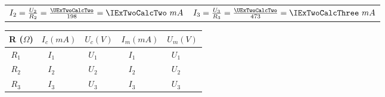 \documentclass{article}
\begin{document}
			\begin{center} \begin{tabular}{c|c}
				\(I_2 = \frac{U_2}{R_2} = \frac{\UExTwoCalcTwo}{\RTwo} = \IExTwoCalcTwo \ mA\)
				&
				\(I_3 = \frac{U_3}{R_3} = \frac{\UExTwoCalcTwo}{\RMax} = \IExTwoCalcThree \ mA\)\\
			\end{tabular} \end{center}

			\begin{center} \begin{tabular}{|c|c|c|c|c|c|c|c|c|c|}
				\hline
					\multicolumn{2}{|c|}{R ($\Omega$)} &
					\multicolumn{2}{c|}{$I_c (mA)$} &
					\multicolumn{2}{c|}{$U_c (V)$} &
					\multicolumn{2}{c|}{$I_m (mA)$} &
					\multicolumn{2}{c|}{$U_m (V)$}\\
				\hline

				$R_1$ & \ROne & $I_1$ & \IExTwoCalcOne & $U_1$ & \UExTwoCalcOne & $I_1$ & \IExTwoOne & $U_1$ & \UExTwoOne\\
				\hline

				$R_2$ & \RTwo & $I_2$ & \IExTwoCalcTwo & $U_2$ & \UExTwoCalcTwo & $I_2$ & \IExTwoTwo & $U_2$ & \UExTwoTwo\\
				\hline

				$R_3$ & \RMax & $I_3$ & \IExTwoCalcThree & $U_3$ & \UExTwoCalcTwo & $I_3$ & \IExTwoThree & $U_3$ & \UExTwoThree\\
				\hline
			\end{tabular} \end{center}
		
		\subsection{}
\end{document}
